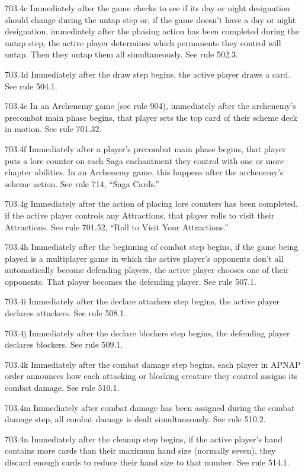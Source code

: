 703.4c Immediately after the game checks to see if its day or night designation should change during the untap step or, if the game doesn’t have a day or night designation, immediately after the phasing action has been completed during the untap step, the active player determines which permanents they control will untap. Then they untap them all simultaneously. See rule 502.3.

703.4d Immediately after the draw step begins, the active player draws a card. See rule 504.1.

703.4e In an Archenemy game (see rule 904), immediately after the archenemy’s precombat main phase begins, that player sets the top card of their scheme deck in motion. See rule 701.32.

703.4f Immediately after a player’s precombat main phase begins, that player puts a lore counter on each Saga enchantment they control with one or more chapter abilities. In an Archenemy game, this happens after the archenemy’s scheme action. See rule 714, “Saga Cards.”

703.4g Immediately after the action of placing lore counters has been completed, if the active player controls any Attractions, that player rolls to visit their Attractions. See rule 701.52, “Roll to Visit Your Attractions.”

703.4h Immediately after the beginning of combat step begins, if the game being played is a multiplayer game in which the active player’s opponents don’t all automatically become defending players, the active player chooses one of their opponents. That player becomes the defending player. See rule 507.1.

703.4i Immediately after the declare attackers step begins, the active player declares attackers. See rule 508.1.

703.4j Immediately after the declare blockers step begins, the defending player declares blockers. See rule 509.1.

703.4k Immediately after the combat damage step begins, each player in APNAP order announces how each attacking or blocking creature they control assigns its combat damage. See rule 510.1.

703.4m Immediately after combat damage has been assigned during the combat damage step, all combat damage is dealt simultaneously. See rule 510.2.

703.4n Immediately after the cleanup step begins, if the active player’s hand contains more cards than their maximum hand size (normally seven), they discard enough cards to reduce their hand size to that number. See rule 514.1.

